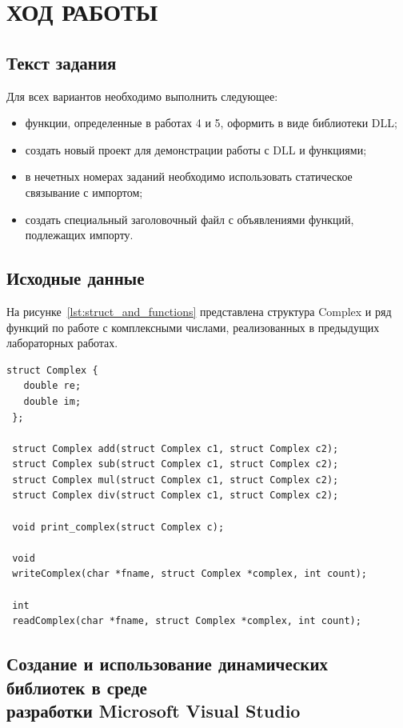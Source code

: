 \section{ХОД РАБОТЫ}

\subsection{Текст задания}

Для всех вариантов необходимо выполнить следующее:

\begin{itemize}
\item
  функции, определенные в работах 4 и 5, оформить в виде библиотеки DLL;
\item
  создать новый проект для демонстрации работы с DLL и функциями;
\item
  в нечетных номерах заданий необходимо использовать
  статическое связывание с импортом; 
\item
  создать специальный заголовочный файл с объявлениями функций,
  подлежащих импорту.
\end{itemize}

\subsection{Исходные данные}

На рисунке~\ref{lst:struct_and_functions} представлена структура Complex
и ряд функций по работе с комплексными числами,
реализованных в предыдущих лабораторных работах.

\begin{lstlisting}[caption=Структура Complex
  и прототипы функций для работы с ней,
  label=lst:struct_and_functions]
 struct Complex {
   double re;
   double im;
 };
 
 struct Complex add(struct Complex c1, struct Complex c2);
 struct Complex sub(struct Complex c1, struct Complex c2);
 struct Complex mul(struct Complex c1, struct Complex c2);
 struct Complex div(struct Complex c1, struct Complex c2);
 
 void print_complex(struct Complex c);
 
 void
 writeComplex(char *fname, struct Complex *complex, int count);

 int
 readComplex(char *fname, struct Complex *complex, int count);
\end{lstlisting}

\subsection{Создание и использование динамических библиотек
  в среде \\ разработки Microsoft Visual Studio}

